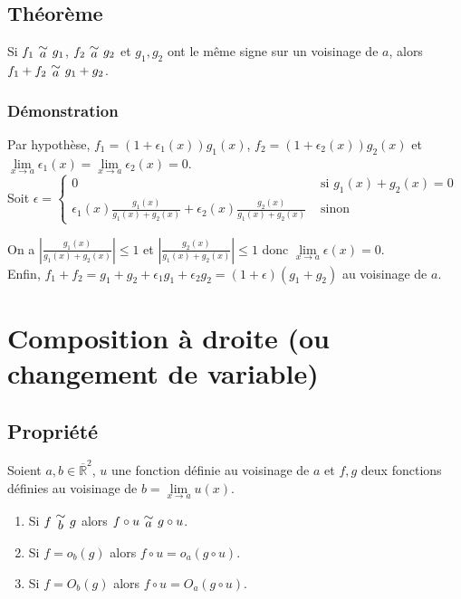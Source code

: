 \documentclass[a4paper,10pt]{book} %
\newcommand{\Rb}{\overline{\mathbb{R}}}
\newcommand{\equi}[1]{\renewcommand{\arraystretch}{0.3}~\begin{matrix}\sim\\#1\end{matrix}~\renewcommand{\arraystretch}{1}}
\begin{document}
\subsection{Théorème}
Si $f_1 \equi{a} g_1$, $f_2 \equi{a}g_2$ et $g_1,g_2$ ont le même signe sur un voisinage de $a$, alors $f_1+f_2 \equi{a} g_1+g_2$.

\subsubsection{Démonstration}
Par hypothèse, $f_1=(1+\epsilon_1(x))g_1(x)$, $f_2=(1+\epsilon_2(x))g_2(x)$ et $\lim\limits_{x\rightarrow a}\epsilon_1(x)=\lim\limits_{x\rightarrow a}\epsilon_2(x)=0$.\\

Soit $\epsilon=\left\{\begin{array}{clr}
0 &\text{ si }g_1(x)+g_2(x)=0 \\
\epsilon_1(x)\frac{g_1(x)}{g_1(x)+g_2(x)}+\epsilon_2(x)\frac{g_2(x)}{g_1(x)+g_2(x)} &\text{ sinon}
\end{array}\right.$\\

\smallskip

On a $|\frac{g_1(x)}{g_1(x)+g_2(x)}|\leq 1$ et $|\frac{g_2(x)}{g_1(x)+g_2(x)}|\leq 1$ donc $\lim\limits_{x\rightarrow a}\epsilon(x)=0$.\\

Enfin, $f_1+f_2=g_1+g_2+\epsilon_1g_1+\epsilon_2g_2=(1+\epsilon)(g_1+g_2)$ au voisinage de $a$.\\

\newpage

\section{Composition à droite (ou changement de variable)}
\subsection{Propriété}
Soient $a,b\in \Rb^2$, $u$ une fonction définie au voisinage de $a$ et $f,g$ deux fonctions définies au voisinage de $b=\lim\limits_{x\rightarrow a}u(x)$.

\begin{enumerate}
\item Si $f \equi{b} g$ alors $f \circ u \equi{a} g\circ u$.
\item Si $f=o_b(g)$ alors $f\circ u=o_a(g\circ u)$.
\item Si $f=O_b(g)$ alors $f\circ u = O_a(g\circ u)$.
\end{enumerate}
\end{document}
